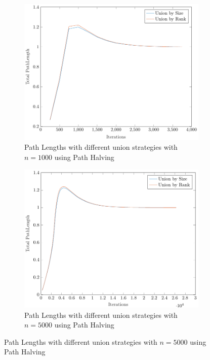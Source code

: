 \begin{figure}[ht]
    \begin{subfigure}{0.32\textwidth}
        \centering
        \includegraphics[width=\textwidth]{../images/plotPHNonFull1000_PathLength.pdf}
        \caption{Path Lengths with different union strategies with $n = 1000$ using Path Halving}
    \end{subfigure}%
    \hfill
    \begin{subfigure}{0.32\textwidth}
        \centering
        \includegraphics[width=\textwidth]{../images/plotPHNonFull5000_PathLength.pdf}
        \caption{Path Lengths with different union strategies with $n = 5000$ using Path Halving}
    \end{subfigure}%

\end{figure}
